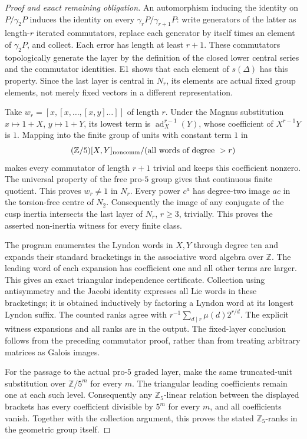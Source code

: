 \documentclass[11pt,a4paper]{article}
\begin{document}
\begin{proof}[Proof and exact remaining obligation]
An automorphism inducing the identity on $P/\gamma_2P$ induces the identity on every $\gamma_rP/\gamma_{r+1}P$: write generators of the latter as length-$r$ iterated commutators, replace each generator by itself times an element of $\gamma_2P$, and collect. Each error has length at least $r+1$. These commutators topologically generate the layer by the definition of the closed lower central series and the commutator identities. E1 shows that each element of $s(\Delta)$ has this property. Since the last layer is central in $N_r$, its elements are actual fixed group elements, not merely fixed vectors in a different representation.

Take $w_r=[x,[x,\ldots,[x,y]\ldots]]$ of length $r$. Under the Magnus substitution $x\mapsto1+X$, $y\mapsto1+Y$, its lowest term is $\operatorname{ad}_X^{r-1}(Y)$, whose coefficient of $X^{r-1}Y$ is $1$. Mapping into the finite group of units with constant term $1$ in
\[
 (\mathbb Z/5)[X,Y]_{\rm noncomm}/(\text{all words of degree }>r)
\]
makes every commutator of length $r+1$ trivial and keeps this coefficient nonzero. The universal property of the free pro-$5$ group gives that continuous finite quotient. This proves $w_r\ne1$ in $N_r$. Every power $c^a$ has degree-two image $a c$ in the torsion-free centre of $N_2$. Consequently the image of any conjugate of the cusp inertia intersects the last layer of $N_r$, $r\ge3$, trivially. This proves the asserted non-inertia witness for every finite class.

The program enumerates the Lyndon words in $X,Y$ through degree ten and expands their standard bracketings in the associative word algebra over $\mathbb Z$. The leading word of each expansion has coefficient one and all other terms are larger. This gives an exact triangular independence certificate. Collection using antisymmetry and the Jacobi identity expresses all Lie words in these bracketings; it is obtained inductively by factoring a Lyndon word at its longest Lyndon suffix. The counted ranks agree with $r^{-1}\sum_{d\mid r}\mu(d)2^{r/d}$. The explicit witness expansions and all ranks are in the output. The fixed-layer conclusion follows from the preceding commutator proof, rather than from treating arbitrary matrices as Galois images.

For the passage to the actual pro-$5$ graded layer, make the same
truncated-unit substitution over $\mathbb Z/5^m$ for every $m$.
The triangular leading coefficients remain one at each such level.
Consequently any $\mathbb Z_5$-linear relation between the displayed
brackets has every coefficient divisible by $5^m$ for every $m$, and
all coefficients vanish. Together with the collection argument, this
proves the stated $\mathbb Z_5$-ranks in the geometric group itself.


\end{proof}
\end{document}
